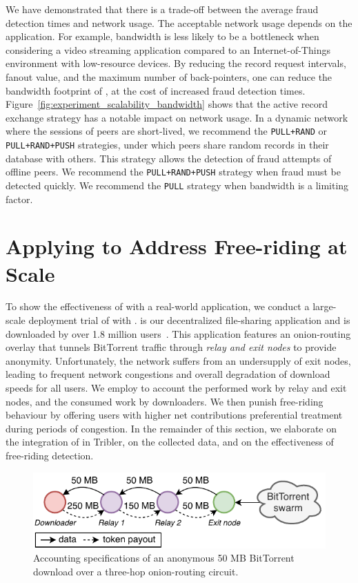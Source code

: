We have demonstrated that there is a trade-off between the average fraud detection times and network usage.
The acceptable network usage depends on the application.
For example, bandwidth is less likely to be a bottleneck when considering a video streaming application compared to an Internet-of-Things environment with low-resource devices.
By reducing the record request intervals, fanout value, and the maximum number of back-pointers, one can reduce the bandwidth footprint of \TrustChain{}, at the cost of increased fraud detection times.
Figure~\ref{fig:experiment_scalability_bandwidth} shows that the active record exchange strategy has a notable impact on network usage.
In a dynamic network where the sessions of peers are short-lived, we recommend the \texttt{PULL+RAND} or \texttt{PULL+RAND+PUSH} strategies, under which peers share random records in their database with others.
This strategy allows the detection of fraud attempts of offline peers.
We recommend the \texttt{PULL+RAND+PUSH} strategy when fraud must  be detected quickly.
We recommend the \texttt{PULL} strategy when bandwidth is a limiting factor.

\section{Applying \TrustChain{} to Address Free-riding at Scale}
\label{sec:deployment}
To show the effectiveness of \TrustChain{} with a real-world application, we conduct a large-scale deployment trial of \TrustChain{} with \Tribler{}.
\Tribler{} is our decentralized file-sharing application and is downloaded by over 1.8 million users~\cite{pouwelse2008tribler}.
This application features an onion-routing overlay that tunnels BitTorrent traffic through \emph{relay and exit nodes} to provide anonymity.
Unfortunately, the \Tribler{} network suffers from an undersupply of exit nodes, leading to frequent network congestions and overall degradation of download speeds for all users.
We employ \TrustChain{} to account the performed work by relay and exit nodes, and the consumed work by downloaders.
We then punish free-riding behaviour by offering users with higher net contributions preferential treatment during periods of congestion.
In the remainder of this section, we elaborate on the integration of \TrustChain{} in Tribler, on the collected data, and on the effectiveness of free-riding detection.

\begin{figure}[t]
	\centering
	\includegraphics[width=.8\linewidth]{trustchain/assets/payouts}
	\caption{Accounting specifications of an anonymous 50 MB BitTorrent download over a three-hop onion-routing circuit.}
	\label{fig:payouts}
\end{figure}

